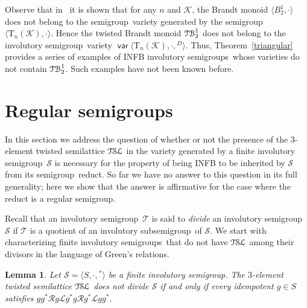 \documentclass[11pt,reqno]{amsart}
\def\Rc{\mathrel{\mathscr{R}}}
\def\Lc{\mathrel{\mathscr{L}}}
\newcommand{\sgp}{semi\-group}
\newcommand{\is}{involutory semi\-group}
\newcommand{\iss}{involutory semi\-groups}
\newcommand{\fis}{finite involutory semi\-group}
\newcommand{\fiss}{finite involutory semi\-groups}
\newcommand{\TSL}{\ensuremath{\mathcal{T\kern-.5pt S\kern-.5pt L}}}
\newcommand{\TB}{\ensuremath{\mathcal{T\kern-.5pt B}_2^1}}
\newtheorem{Lemma}[Thm]{Lemma}
\DeclareMathOperator{\var}{\mathsf{var}}
\begin{document}
Observe that in~\cite{Goldberg&Volkov:2003} it is shown that for any $n$ and $\mathcal{K}$, the Brandt monoid $\langle B_2^1,\cdot\rangle$
does not belong to the \sgp\ variety generated by the \sgp\ $\langle\mathrm{T}_n(\mathcal{K}),\cdot\rangle$. Hence the twisted Brandt
monoid $\TB$ does not belong to the \is\ variety $\var\langle\mathrm{T}_n(\mathcal{K}),\cdot,{}^D\rangle$. Thus, Theorem~\ref{triangular}
provides a series of examples of INFB \iss\ whose varieties do not contain $\TB$. Such examples have not been known before.

\section{Regular semigroups}
\label{sec:regular}

In this section we address the question of whether or not the presence of the 3-element twisted semilattice $\TSL$ in the variety generated
by a \fis\ $\mathcal{S}$ is necessary for the property of being INFB to be inherited by $\mathcal{S}$ from its \sgp\ reduct. So far we have
no answer to this question in its full generality; here we show that the answer is affirmative for the case where the reduct is a regular
\sgp.

Recall that an \is\ $\mathcal{T}$ is said to \emph{divide} an \is\ $\mathcal{S}$ if $\mathcal{T}$ is a quotient of an involutory sub\sgp\
of $\mathcal{S}$. We start with characterizing \fiss\ that do not have $\TSL$ among their divisors in the language of Green's relations.

\begin{Lemma}
\label{D-structure} Let $\mathcal{S}=\langle S,\cdot,{}^*\rangle$ be a \fis. The $3$-element twisted semilattice $\TSL$ does not divide
$\mathcal{S}$ if and only if every idempotent $g\in S$ satisfies $gg^*\Rc g\Lc g^*g\Rc g^*\Lc gg^*$.
\end{Lemma}
\end{document}

